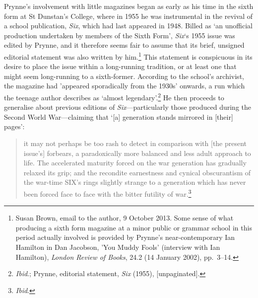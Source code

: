 \documentclass[]{article}
\begin{document}
Prynne’s involvement with little magazines began as early as his time in
the sixth form at St Dunstan’s College, where in 1955 he was
instrumental in the revival of a school publication, \emph{Six}, which
had last appeared in 1948. Billed as ‘an unofficial production
undertaken by members of the Sixth Form’, \emph{Six}‘s 1955 issue was
edited by Prynne, and it therefore seems fair to assume that its brief,
unsigned editorial statement was also written by him.\footnote{Susan
  Brown, email to the author, 9 October 2013. Some sense of what
  producing a sixth form magazine at a minor public or grammar school in
  this period actually involved is provided by Prynne’s
  near-contemporary Ian Hamilton in Dan Jacobson, ’You Muddy Fools’
  (interview with Ian Hamilton), \emph{London Review of Books}, 24.2 (14
  January 2002), pp.~3–14.} This statement is conspicuous in its desire
to place the issue within a long-running tradition, or at least one that
might seem long-running to a sixth-former. According to the school’s
archivist, the magazine had ’appeared sporadically from the 1930s’
onwards, a run which the teenage author describes as ‘almost
legendary’.\footnote{\emph{Ibid}.; Prynne, editorial statement,
  \emph{Six} (1955), {[}unpaginated{]}.} He then proceeds to generalise
about previous editions of \emph{Six}—particularly those produced during
the Second World War—claiming that ‘{[}a{]} generation stands mirrored
in {[}their{]} pages’:

\begin{quote}
\singlespacing it may not perhaps be too rash to detect in comparison
with {[}the present issue’s{]} forbears, a paradoxically more balanced
and less adult approach to life. The accelerated maturity forced on the
war generation has gradually relaxed its grip; and the recondite
earnestness and cynical obscurantism of the war-time SIX’s rings
slightly strange to a generation which has never been forced face to
face with the bitter futility of war.\footnote{\emph{Ibid}.}
\end{quote}
\end{document}
